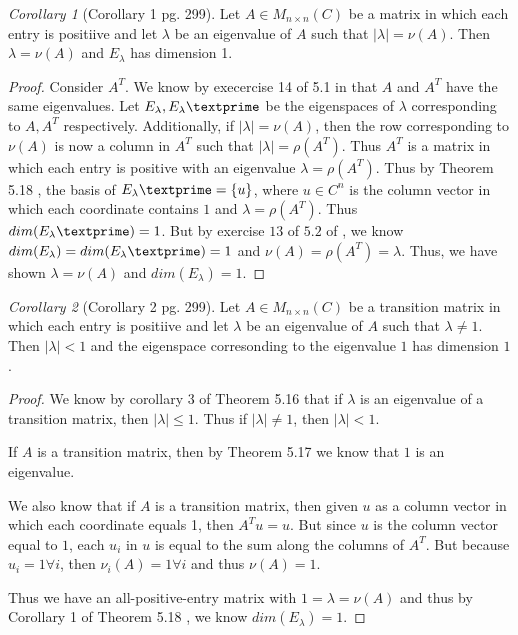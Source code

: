 \documentclass{amsart}
\theoremstyle{definition}
\theoremstyle{remark}
\newtheorem{corollary}{Corollary}[theorem]
\numberwithin{equation}{section}
\begin{document}
\begin{corollary}[Corollary 1 pg. 299]

	Let $A \in M_{n \times n}(C)$ be a matrix in which each entry is positiive and let $\lambda$ be an eigenvalue of $A$ such that $|\lambda| = \nu(A)$.
	Then  $\lambda = \nu(A)$ and $E_{\lambda}$ has dimension 1.

\end{corollary}

\begin{proof}

	Consider $A^T$.  
	We know by execercise 14 of 5.1 in \cite{friedberg2003linear} that $A$ and $A^T$ have the same eigenvalues.
	Let $E_{\lambda}, E_{\lambda}\textprime$ be the eigenspaces of $\lambda$ corresponding to $A, A^T$ respectively.
	Additionally, if $|\lambda| = \nu(A)$, then the row  corresponding to $\nu(A)$ is now a column in $A^T$ such that $|\lambda| = \rho(A^T)$.
	Thus $A^T$ is a matrix in which each entry is positive with an eigenvalue $\lambda = \rho(A^T)$.
	Thus by Theorem 5.18 \cite{friedberg2003linear}, the basis of $E_{\lambda}\textprime = \{ u \}$, where $u \in C^n$ is the column vector in which each coordinate contains $1$ and $\lambda = \rho(A^T)$.
	Thus $dim(E_{\lambda}\textprime) = 1$.
	But by exercise $13$ of $5.2$ of \cite{friedberg2003linear}, we know $dim(E_{\lambda}) = dim(E_{\lambda}\textprime) = 1$ and $\nu(A) = \rho(A^T) = \lambda$.
	Thus, we have shown $\lambda = \nu(A)$ and $dim(E_{\lambda}) = 1$.

\end{proof}



\begin{corollary}[Corollary 2 pg. 299]

	Let $A \in M_{n \times n}(C)$ be a transition matrix in which each entry is positiive and let $\lambda$ be an eigenvalue of $A$ such that $\lambda \neq 1$.
	Then  $|\lambda| < 1$ and the eigenspace corresonding to the eigenvalue $1$ has dimension $1$.

\end{corollary}

\begin{proof}
	We know by corollary 3 of Theorem 5.16 \cite{friedberg2003linear} that if $\lambda$ is an eigenvalue of a transition matrix, then $|\lambda| \leq 1$.
	Thus if $|\lambda| \neq 1$, then $|\lambda| < 1$.

	If $A$ is a transition matrix, then by Theorem 5.17 \cite{friedberg2003linear} we know that $1$ is an eigenvalue. 

	We also know that if $A$ is a transition matrix, then given $u$ as a column vector in which each coordinate equals 1, then $A^Tu = u$.
	But since $u$ is the column vector equal to $1$, each $u_i$ in $u$ is equal to the sum along the columns of $A^T$.
	But because $u_i = 1 \forall i$, then $\nu_i(A) = 1 \forall i$ and thus $\nu(A) = 1$.

	Thus we have an all-positive-entry matrix with $1 = \lambda = \nu(A) $ and thus by Corollary 1 of Theorem 5.18 , we know $dim(E_{\lambda}) = 1$.


\end{proof}
\end{document}

